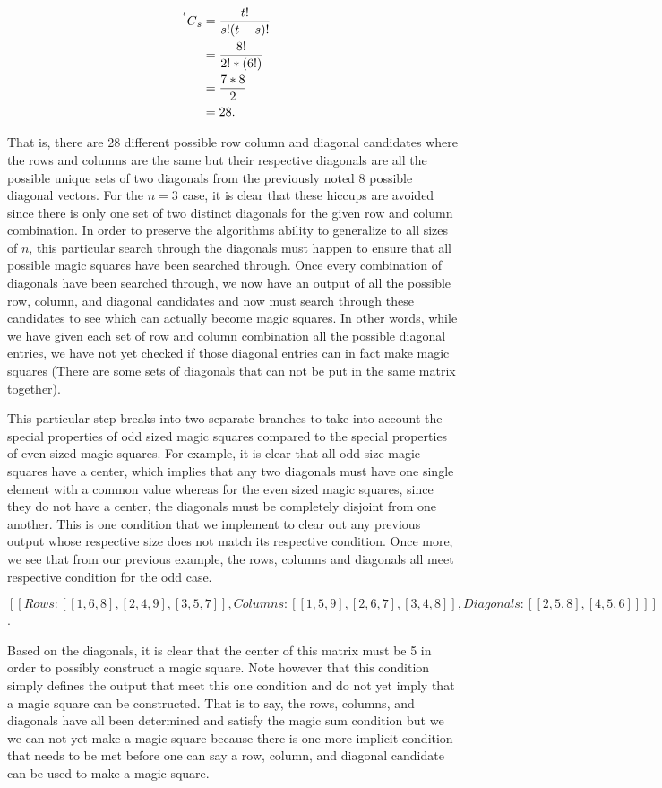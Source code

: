 \documentclass{article}
\newcommand\Mycomb[2][^t]{\prescript{#1\mkern-0.5mu}{}C_{#2}}
\begin{document}
    \begin{center}
        \begin{align}
            \Mycomb{s} &= \frac{t!}{s!(t-s)!}\quad\\
            &=  \frac{8!}{2!*(6!)}\\
            &=  \frac{7 * 8}{2}\\
            &= 28. 
        \end{align}
    \end{center}
    That is, there are 28 different possible row column and diagonal candidates where the rows and columns are the same but their respective diagonals are all the possible unique sets of two diagonals from the previously noted 8 possible diagonal vectors. For the $n = 3$ case, it is clear that these hiccups are avoided since there is only one set of two distinct diagonals for the given row and column combination. In order to preserve the algorithms ability to generalize to all sizes of $n$, this particular search through the diagonals must happen to ensure that all possible magic squares have been searched through. Once every combination of diagonals have been searched through, we now have an output of all the possible row, column, and diagonal candidates and now must search through these candidates to see which can actually become magic squares. In other words, while we have given each set of row and column combination all the possible diagonal entries, we have not yet checked if those diagonal entries can in fact make magic squares (There are some sets of diagonals that can not be put in the same matrix together).
    
    This particular step breaks into two separate branches to take into account the special properties of odd sized magic squares compared to the special properties of even sized magic squares. For example, it is clear that all odd size magic squares have a center, which implies that any two diagonals must have one single element with a common value whereas for the even sized magic squares, since they do not have a center, the diagonals must be completely disjoint from one another. This is one condition that we implement to clear out any previous output whose respective size does not match its respective condition. Once more, we see that from our previous example, the rows, columns and diagonals all meet respective condition for the odd case.
    \begin{center}
        $[[Rows: [[1, 6, 8], [2, 4, 9], [3, 5, 7]], Columns: [[1, 5, 9], [2, 6, 7], [3, 4, 8]], Diagonals: [[2, 5, 8], [4, 5, 6]]]]$.
    \end{center}
     Based on the diagonals, it is clear that the center of this matrix must be 5 in order to possibly construct a magic square. Note however that this condition simply defines the output that meet this one condition and do not yet imply that a magic square can be constructed. That is to say, the rows, columns, and diagonals have all been determined and satisfy the magic sum condition but we we can not yet make a magic square because there is one more implicit condition that needs to be met before one can say a row, column, and diagonal candidate can be used to make a magic square. 
    
\end{document}
